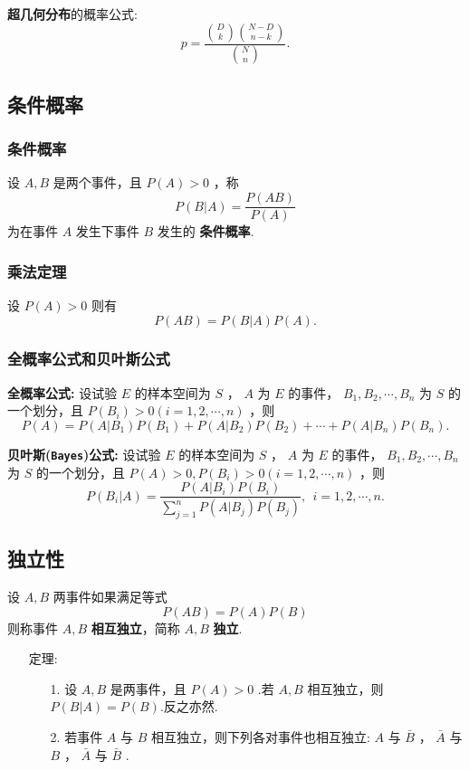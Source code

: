 \documentclass[UTF8,10pt]{ctexart}
\begin{document}
	\textbf{超几何分布}的概率公式: $$ p= \frac{ \binom{D}{k} \binom{N-D}{n-k} }{ \binom{N}{n} }. $$ 
	
	\subsection{条件概率}
	
	\subsubsection{条件概率}
	
	设 $ A,B $ 是两个事件，且 $ P(A)>0 $ ，称 $$ P(B|A)= \frac{P(AB)}{P(A)} $$ 为在事件 $ A $ 发生下事件 $ B $ 发生的 \textbf{条件概率}.
	
	\subsubsection{乘法定理}
	
	设 $ P(A)>0 $ 则有 $$ P(AB)=P(B|A)P(A). $$ 
	
	\subsubsection{全概率公式和贝叶斯公式}
	
	\textbf{全概率公式:} 设试验 $ E $ 的样本空间为 $ S $ ， $ A $ 为 $ E $ 的事件， $ B_{1},B_{2}, \cdots ,B_{n} $ 为 $ S $ 的一个划分，且 $ P(B_{i})>0(i=1,2, \cdots ,n) $ ，则 $$ P(A)=P(A|B_{1})P(B_{1})+P(A|B_{2})P(B_{2})+ \cdots +P(A|B_{n})P(B_{n}). $$ 
	
	\textbf{贝叶斯(\texttt{Bayes})公式:} 设试验 $ E $ 的样本空间为 $ S $ ， $ A $ 为 $ E $ 的事件， $ B_{1},B_{2}, \cdots ,B_{n} $ 为 $ S $ 的一个划分，且 $ P(A)>0,P(B_{i})>0(i=1,2, \cdots ,n) $ ，则 $$ P(B_{i}|A)= \frac{P(A|B_{i})P(B_{i})}{\sum\limits_{j=1}^{n}P(A|B_{j})P(B_{j})},\ \ i=1,2, \cdots ,n. $$ 
	
	\subsection{独立性}
	
	设 $ A,B $ 两事件如果满足等式 $$ P(AB)=P(A)P(B) $$ 则称事件 $ A,B $ \textbf{相互独立}，简称 $ A,B $ \textbf{独立}.
	
	\begin{itemize}
		\item [定理:] {
			\begin{enumerate}
				\item [1.] 设 $ A,B $ 是两事件，且 $ P(A)>0 $ .若 $ A,B $ 相互独立，则 $ P(B|A)=P(B) $.反之亦然.
				\item [2.] 若事件 $ A $ 与 $ B $ 相互独立，则下列各对事件也相互独立: $ A $ 与 $ \bar{B} $ ， $ \bar{A} $ 与 $ B $ ， $ \bar{A} $ 与 $ \bar{B} $ .
			\end{enumerate}
		}
	\end{itemize}
	
\end{document}
